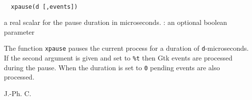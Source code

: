 \begin{mandesc}
  \\
\end{mandesc}
\begin{calling_sequence}
\begin{verbatim}
  xpause(d [,events])
\end{verbatim}
\end{calling_sequence}
\begin{parameters}
  \begin{varlist}
     a real scalar for the pause duration in microseconds.
    : an optional boolean parameter
  \end{varlist}
\end{parameters}
%
\begin{mandescription}
  The function \verb!xpause! pauses the current process for
  a duration of \verb!d!-microseconds. If the second argument
  is given and set to \verb!%t! then Gtk events are processed
  during the pause. When the duration is set to \verb!0! pending
  events are also processed.
\end{mandescription}
\begin{authors}
  J.-Ph. C.
\end{authors}
